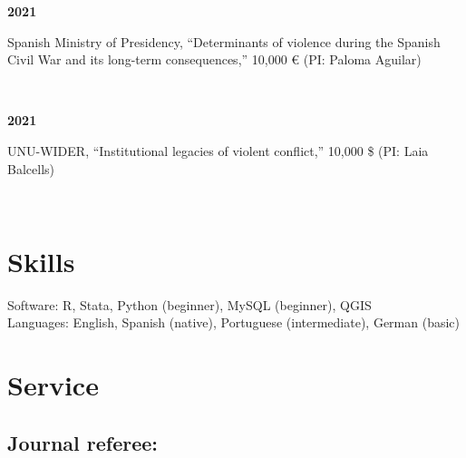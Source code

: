 \documentclass[a4paper, 12pt]{article}
\begin{document}
\begin{minipage}[t]{0.1\textwidth}
\textbf{2021}
\end{minipage}\hfill\begin{minipage}[t]{0.9\textwidth}
Spanish Ministry of Presidency, ``Determinants of violence during the Spanish Civil War and its long-term consequences,'' 10,000 € (PI: Paloma Aguilar)\\\vspace{-8pt}
\end{minipage}\\
\begin{minipage}[t]{0.1\textwidth}
\textbf{2021}
\end{minipage}\hfill\begin{minipage}[t]{0.9\textwidth}
UNU-WIDER, ``Institutional legacies of violent conflict,'' 10,000 \$ (PI: Laia Balcells)
\end{minipage}\\


\section*{Skills}

Software: R, Stata, Python (beginner), MySQL (beginner), QGIS\\
Languages: English, Spanish (native), Portuguese (intermediate), German (basic)

\section*{Service}

%

\subsection*{Journal referee:}
\end{document}
